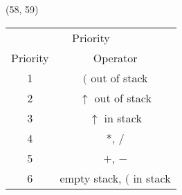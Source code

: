\item \begin{theorem}{(58, 59)} \quad\quad
    \begin{table}[H]
        \centering
        \begin{tabular}{|c|c|}
            \hline
            \multicolumn{2}{|c|}{Priority} \\
            \Xhline{3\arrayrulewidth}
            Priority & Operator \\
            \Xhline{2\arrayrulewidth}
            1 & $($ out of stack \\
            \hline
            2 & $\uparrow$ out of stack \\
            \hline
            3 & $\uparrow$ in stack \\
            \hline
            4 & $*$, $/$ \\
            \hline
            5 & $+$, $-$ \\
            \hline
            6 & empty stack, $($ in stack \\
            \hline
        \end{tabular}
    \end{table}
\end{theorem}
